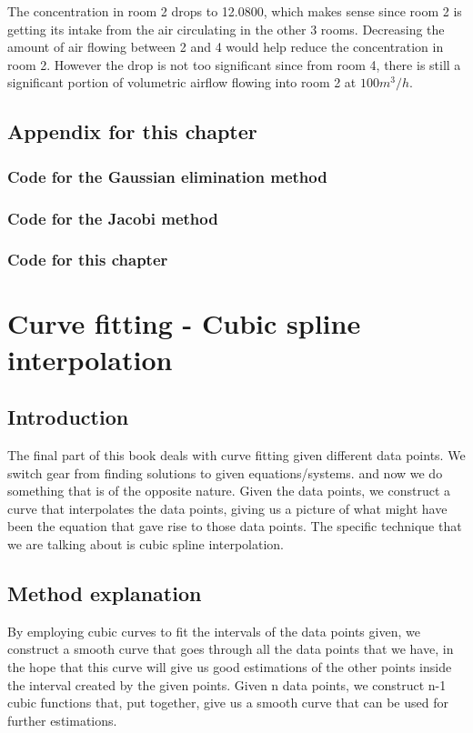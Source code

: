 \documentclass[openany]{book}
\begin{document}
	The concentration in room 2 drops to 12.0800, which makes sense since room 2 is getting its  intake from the air circulating in the other 3 rooms. Decreasing the amount of air flowing between 2 and 4 would help reduce the concentration in room 2. However the drop is not too significant since from room 4, there is still a significant portion of volumetric airflow flowing into room 2 at ${100m^3/h}$.
    \section{Appendix for this chapter}
    \subsection{Code for the Gaussian elimination method}
	
    \subsection{Code for the Jacobi method}
	
    \subsection{Code for this chapter}
	
    
    \chapter{Curve fitting - Cubic spline interpolation}
    \section{Introduction}
    The final part of this book deals with curve fitting given different data points. We switch gear from finding solutions to given equations/systems. and now we do something that is of the opposite nature. Given the data points, we construct a curve that interpolates the data points, giving us a picture of what might have been the equation that gave rise to those data points. The specific technique that we are talking about is cubic spline interpolation. 
    \section{Method explanation}
    By employing cubic curves to fit the intervals of the data points given, we construct a smooth curve that goes through all the data points that we have, in the hope that this curve will give us good estimations of the other points inside the interval created by the given points. Given n data points, we construct n-1 cubic functions that, put together, give us a smooth curve that can be used for further estimations.
\end{document}
